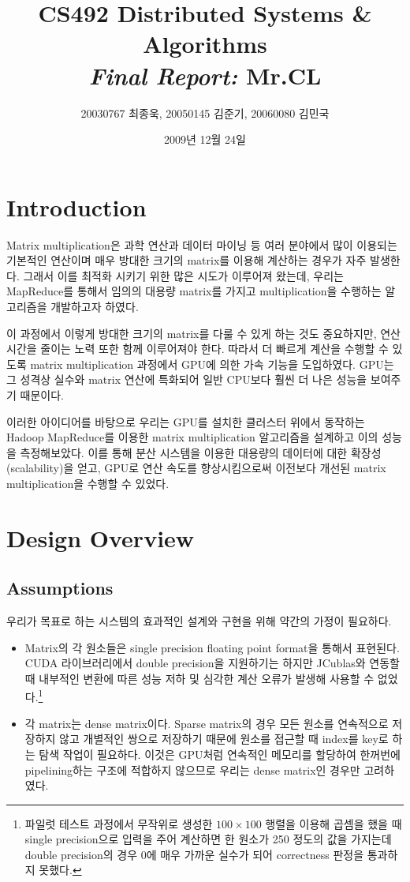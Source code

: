 \documentclass[a4paper]{article}
\begin{document}
\title{CS492 Distributed Systems \& Algorithms\\ \textit{Final Report:} \textbf{Mr.CL}}
\author{20030767 최종욱, 20050145 김준기, 20060080 김민국}
\date{2009년 12월 24일}
\vspace{-40pt}
\maketitle

\begin{multicols}{2}
\section{Introduction}
Matrix multiplication은 과학 연산과 데이터 마이닝 등 여러 분야에서 많이 이용되는 기본적인 연산이며 매우 방대한 크기의 matrix를 이용해 계산하는 경우가 자주 발생한다.
그래서 이를 최적화 시키기 위한 많은 시도가 이루어져 왔는데, 우리는 MapReduce를 통해서 임의의 대용량 matrix를 가지고 multiplication을 수행하는 알고리즘을 개발하고자 하였다.

이 과정에서 이렇게 방대한 크기의 matrix를 다룰 수 있게 하는 것도 중요하지만, 연산 시간을 줄이는 노력 또한 함께 이루어져야 한다.
따라서 더 빠르게 계산을 수행할 수 있도록 matrix multiplication 과정에서 GPU에 의한 가속 기능을 도입하였다.
GPU는 그 성격상 실수와 matrix 연산에 특화되어 일반 CPU보다 훨씬 더 나은 성능을 보여주기 때문이다.

이러한 아이디어를 바탕으로 우리는 GPU를 설치한 클러스터 위에서 동작하는 Hadoop MapReduce를 이용한 matrix multiplication 알고리즘을 설계하고 이의 성능을 측정해보았다.
이를 통해 분산 시스템을 이용한 대용량의 데이터에 대한 확장성(scalability)을 얻고, GPU로 연산 속도를 향상시킴으로써 이전보다 개선된 matrix multiplication을 수행할 수 있었다.

\section{Design Overview}
\subsection{Assumptions}
우리가 목표로 하는 시스템의 효과적인 설계와 구현을 위해 약간의 가정이 필요하다.
\begin{itemize}
	\item Matrix의 각 원소들은 single precision floating point format을 통해서 표현된다. CUDA 라이브러리에서 double precision을 지원하기는 하지만 JCublas와 연동할 때 내부적인 변환에 따른 성능 저하 및 심각한 계산 오류가 발생해 사용할 수 없었다.\footnote{파일럿 테스트 과정에서 무작위로 생성한 $100 \times 100$ 행렬을 이용해 곱셈을 했을 때 single precision으로 입력을 주어 계산하면 한 원소가 250 정도의 값을 가지는데 double precision의 경우 0에 매우 가까운 실수가 되어 correctness 판정을 통과하지 못했다.}
	\item 각 matrix는 dense matrix이다. Sparse matrix의 경우 모든 원소를 연속적으로 저장하지 않고 개별적인 쌍으로 저장하기 때문에 원소를 접근할 때 index를 key로 하는 탐색 작업이 필요하다. 이것은 GPU처럼 연속적인 메모리를 할당하여 한꺼번에 pipelining하는 구조에 적합하지 않으므로 우리는 dense matrix인 경우만 고려하였다.
\end{itemize}


\end{multicols}
\end{document}

